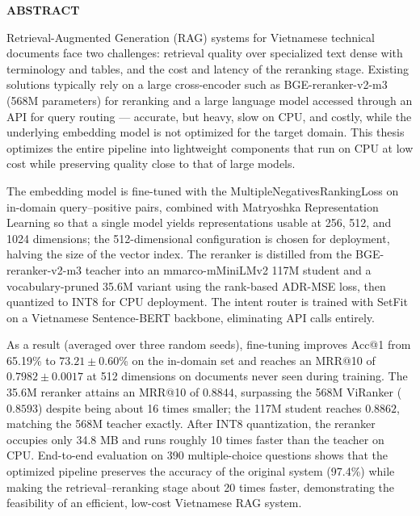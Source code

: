 \documentclass[../DoAn.tex]{subfiles}
\begin{document}
\begin{center}
    \Large{\textbf{ABSTRACT}}\\
\end{center}
\vspace{1cm}

Retrieval-Augmented Generation (RAG) systems for Vietnamese technical documents face two challenges: retrieval quality over specialized text dense with terminology and tables, and the cost and latency of the reranking stage. Existing solutions typically rely on a large cross-encoder such as BGE-reranker-v2-m3 (568M parameters) for reranking and a large language model accessed through an API for query routing --- accurate, but heavy, slow on CPU, and costly, while the underlying embedding model is not optimized for the target domain. This thesis optimizes the entire pipeline into lightweight components that run on CPU at low cost while preserving quality close to that of large models.

The embedding model  is fine-tuned with the MultipleNegativesRankingLoss on in-domain query--positive pairs, combined with Matryoshka Representation Learning so that a single model yields representations usable at 256, 512, and 1024 dimensions; the 512-dimensional configuration is chosen for deployment, halving the size of the vector index. The reranker is distilled from the BGE-reranker-v2-m3 teacher into an mmarco-mMiniLMv2 117M student and a vocabulary-pruned 35.6M variant using the rank-based ADR-MSE loss, then quantized to INT8 for CPU deployment. The intent router is trained with SetFit on a Vietnamese Sentence-BERT backbone, eliminating API calls entirely.

As a result (averaged over three random seeds), fine-tuning improves Acc@1 from 65.19\% to $73.21 \pm 0.60$\% on the in-domain set and reaches an MRR@10 of $0.7982 \pm 0.0017$ at 512 dimensions on documents never seen during training. The 35.6M reranker attains an MRR@10 of $0.8844$, surpassing the 568M ViRanker ($0.8593$) despite being about 16 times smaller; the 117M student reaches $0.8862$, matching the 568M teacher exactly. After INT8 quantization, the reranker occupies only 34.8 MB and runs roughly 10 times faster than the teacher on CPU. End-to-end evaluation on 390 multiple-choice questions shows that the optimized pipeline preserves the accuracy of the original system (97.4\%) while making the retrieval--reranking stage about 20 times faster, demonstrating the feasibility of an efficient, low-cost Vietnamese RAG system.
\end{document}
